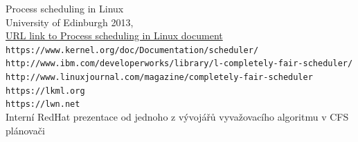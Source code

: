 \documentclass[a4paper,12pt]{article}
\begin{document}
\begin{thebibliography}{9}
               {Process scheduling in Linux} \\ 
               University of Edinburgh 2013, \\ 
	\href{http://criticalblue.com/news/wp-content/uploads/2013/12/linux\_scheduler\_notes\_final.pdf}{URL link to Process scheduling in Linux document}
  \\
               \texttt{https://www.kernel.org/doc/Documentation/scheduler/}
   \\
		\texttt{http://www.ibm.com/developerworks/library/l-completely-fair-scheduler/}
   \\
		\texttt{http://www.linuxjournal.com/magazine/completely-fair-scheduler}
   \\ 
		\texttt{https://lkml.org} \\
		\texttt{https://lwn.net}
   \\
		Interní RedHat prezentace od jednoho z vývojářů vyvažovacího algoritmu v CFS plánovači

\end{thebibliography}
\end{document}
